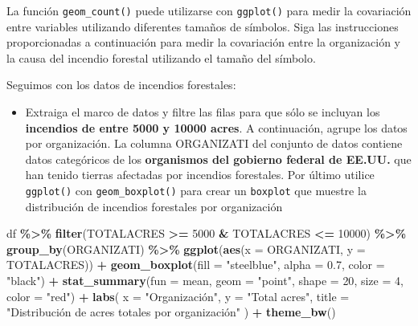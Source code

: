 \documentclass[
]{book}
\newenvironment{Shaded}{\begin{snugshade}}{\end{snugshade}}
\newcommand{\AttributeTok}[1]{\textcolor[rgb]{0.13,0.29,0.53}{#1}}
\newcommand{\DecValTok}[1]{\textcolor[rgb]{0.00,0.00,0.81}{#1}}
\newcommand{\FloatTok}[1]{\textcolor[rgb]{0.00,0.00,0.81}{#1}}
\newcommand{\FunctionTok}[1]{\textcolor[rgb]{0.13,0.29,0.53}{\textbf{#1}}}
\newcommand{\NormalTok}[1]{#1}
\newcommand{\SpecialCharTok}[1]{\textcolor[rgb]{0.81,0.36,0.00}{\textbf{#1}}}
\newcommand{\StringTok}[1]{\textcolor[rgb]{0.31,0.60,0.02}{#1}}
\providecommand{\tightlist}{%
  \setlength{\itemsep}{0pt}\setlength{\parskip}{0pt}}
\begin{document}
La función \texttt{geom\_count()} puede utilizarse con \texttt{ggplot()} para medir la covariación entre variables utilizando diferentes tamaños de símbolos. Siga las instrucciones proporcionadas a continuación para medir la covariación entre la organización y la causa del incendio forestal utilizando el tamaño del símbolo.

Seguimos con los datos de incendios forestales:

\begin{itemize}
\tightlist
\item
  Extraiga el marco de datos y filtre las filas para que sólo se incluyan los \textbf{incendios de entre 5000 y 10000 acres}. A continuación, agrupe los datos por organización. La columna ORGANIZATI del conjunto de datos contiene datos categóricos de los \textbf{organismos del gobierno federal de EE.UU.} que han tenido tierras afectadas por incendios forestales. Por último utilice \texttt{ggplot()} con \texttt{geom\_boxplot()} para crear un \texttt{boxplot} que muestre la distribución de incendios forestales por organización
\end{itemize}

\begin{Shaded}
\begin{Highlighting}[]
\NormalTok{df }\SpecialCharTok{\%\textgreater{}\%}
  \FunctionTok{filter}\NormalTok{(TOTALACRES }\SpecialCharTok{\textgreater{}=} \DecValTok{5000} \SpecialCharTok{\&}\NormalTok{ TOTALACRES }\SpecialCharTok{\textless{}=} \DecValTok{10000}\NormalTok{) }\SpecialCharTok{\%\textgreater{}\%}
  \FunctionTok{group\_by}\NormalTok{(ORGANIZATI) }\SpecialCharTok{\%\textgreater{}\%}
  \FunctionTok{ggplot}\NormalTok{(}\FunctionTok{aes}\NormalTok{(}\AttributeTok{x =}\NormalTok{ ORGANIZATI, }\AttributeTok{y =}\NormalTok{ TOTALACRES)) }\SpecialCharTok{+}
  \FunctionTok{geom\_boxplot}\NormalTok{(}\AttributeTok{fill =} \StringTok{"steelblue"}\NormalTok{, }\AttributeTok{alpha =} \FloatTok{0.7}\NormalTok{, }\AttributeTok{color =} \StringTok{"black"}\NormalTok{) }\SpecialCharTok{+}
  \FunctionTok{stat\_summary}\NormalTok{(}\AttributeTok{fun =}\NormalTok{ mean, }\AttributeTok{geom =} \StringTok{"point"}\NormalTok{, }\AttributeTok{shape =} \DecValTok{20}\NormalTok{, }\AttributeTok{size =} \DecValTok{4}\NormalTok{, }\AttributeTok{color =} \StringTok{"red"}\NormalTok{) }\SpecialCharTok{+}
  \FunctionTok{labs}\NormalTok{(}
    \AttributeTok{x =} \StringTok{"Organización"}\NormalTok{,}
    \AttributeTok{y =} \StringTok{"Total acres"}\NormalTok{,}
    \AttributeTok{title =} \StringTok{"Distribución de acres totales por organización"}
\NormalTok{  ) }\SpecialCharTok{+}
  \FunctionTok{theme\_bw}\NormalTok{()}
\end{Highlighting}
\end{Shaded}
\end{document}

